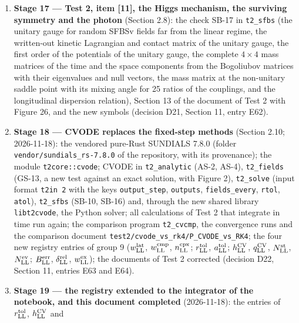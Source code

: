 \documentclass[
  10pt,
]{article}
\begin{document}
\begin{enumerate}
  time-dependent mean-field oscillation of the gap), Section 12 of the
  document of Test 2 with Figure 25, and the new symbols (decision D20,
  Section 11, entry E61).
\item
  \textbf{Stage 17 --- Test 2, item {[}11{]}, the Higgs mechanism, the
  surviving symmetry and the photon} (Section 2.8): the check SB-17 in
  \texttt{t2\_sfbs} (the unitary gauge for random SFBSv fields far from
  the linear regime, the written-out kinetic Lagrangian and contact
  matrix of the unitary gauge, the first order of the potentials of the
  unitary gauge, the complete \(4\times4\) mass matrices of the time and
  the space components from the Bogoliubov matrices with their
  eigenvalues and null vectors, the mass matrix at the non-unitary
  saddle point with its mixing angle for 25 ratios of the couplings, and
  the longitudinal dispersion relation), Section 13 of the document of
  Test 2 with Figure 26, and the new symbols (decision D21, Section 11,
  entry E62).
\item
  \textbf{Stage 18 --- CVODE replaces the fixed-step methods} (Section
  2.10; 2026-11-18): the vendored pure-Rust SUNDIALS 7.8.0 (folder
  \texttt{vendor/sundials\_rs-7.8.0} of the repository, with its
  provenance); the module \texttt{t2core::cvode}; CVODE in
  \texttt{t2\_analytic} (AS-2, AS-4), \texttt{t2\_fields} (GS-13, a new
  test against an exact solution, with Figure 2), \texttt{t2\_solve}
  (input format \texttt{t2in\ 2} with the keys \texttt{output\_step},
  \texttt{outputs}, \texttt{fields\_every}, \texttt{rtol},
  \texttt{atol}), \texttt{t2\_sfbs} (SB-10, SB-16) and, through the new
  shared library \texttt{libt2cvode}, the Python solver; all
  calculations of Test 2 that integrate in time run again; the
  comparison program \texttt{t2\_cvcmp}, the convergence runs and the
  comparison document \texttt{test2/cvode\_vs\_rk4/P\_CVODE\_vs\_RK4};
  the four new registry entries of group 9 (\(w^{\rm lat}_{\rm LL}\),
  \(w^{\rm cmp}_{\rm LL}\), \(n^{\rm cpx}_{\rm LL}\);
  \(r^{\rm tol}_{\rm LL}\), \(a^{\rm tol}_{\rm LL}\);
  \(h^{\rm CV}_{\rm LL}\), \(q^{\rm CV}_{\rm LL}\),
  \(N^{\rm st}_{\rm LL}\), \(N^{\rm ev}_{\rm LL}\);
  \(B^{\rm err}_{\rm LL}\), \(\delta^{\rm rel}_{\rm LL}\),
  \(w^{\rm ex}_{\rm LL}\)); the documents of Test 2 corrected (decision
  D22, Section 11, entries E63 and E64).
\item
  \textbf{Stage 19 --- the registry extended to the integrator of the
  notebook, and this document completed} (2026-11-18): the entries of
  \(r^{\rm tol}_{\rm LL}\), \(h^{\rm CV}_{\rm LL}\) and

\end{enumerate}
\end{document}
